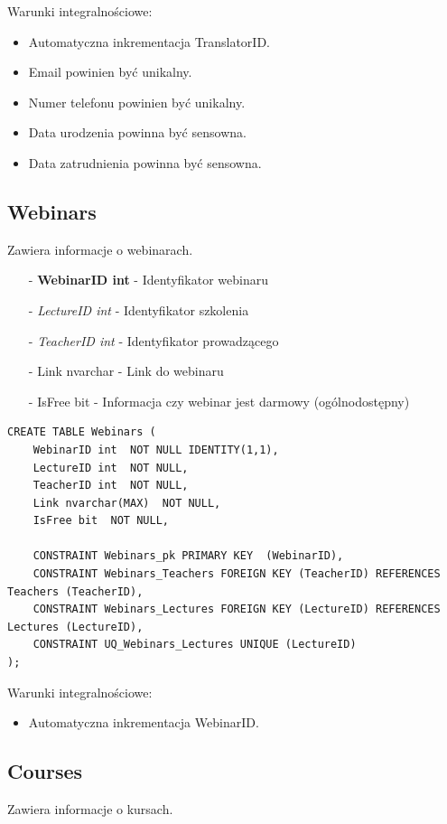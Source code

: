 \documentclass[11pt,a4paper]{article}
\begin{document}
Warunki integralnościowe:
\begin{itemize}
    \item Automatyczna inkrementacja TranslatorID.
    \item Email powinien być unikalny.
    \item Numer telefonu powinien być unikalny.
    \item Data urodzenia powinna być sensowna.
    \item Data zatrudnienia powinna być sensowna.
\end{itemize}

\subsection{Webinars}
Zawiera informacje o webinarach.

\begin{itemize}
    \item[-] \textbf{WebinarID int} - Identyfikator webinaru
    \item[-] \textit{LectureID int} - Identyfikator szkolenia
    \item[-] \textit{TeacherID int} - Identyfikator prowadzącego
    \item[-] Link nvarchar - Link do webinaru
    \item[-] IsFree bit - Informacja czy webinar jest darmowy (ogólnodostępny)
\end{itemize}

\begin{Verbatim}[breaklines=true]
CREATE TABLE Webinars (
    WebinarID int  NOT NULL IDENTITY(1,1),
    LectureID int  NOT NULL,
    TeacherID int  NOT NULL,
    Link nvarchar(MAX)  NOT NULL,
    IsFree bit  NOT NULL,

    CONSTRAINT Webinars_pk PRIMARY KEY  (WebinarID),
    CONSTRAINT Webinars_Teachers FOREIGN KEY (TeacherID) REFERENCES Teachers (TeacherID),
    CONSTRAINT Webinars_Lectures FOREIGN KEY (LectureID) REFERENCES Lectures (LectureID),
    CONSTRAINT UQ_Webinars_Lectures UNIQUE (LectureID)
);
\end{Verbatim}

Warunki integralnościowe:
\begin{itemize}
    \item Automatyczna inkrementacja WebinarID.
\end{itemize}

\subsection{Courses}
Zawiera informacje o kursach.
\end{document}

